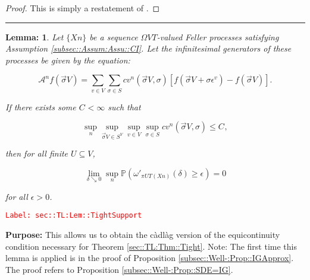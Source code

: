 \documentclass[12pt]{article}
\newcommand{\mb}{\mathbb}
\newcommand{\mc}{\mathcal}
\newcommand{\ep}{\epsilon}
\newcommand{\tr}{\textcolor{red}}
\newcommand{\labe}[1]{\tr{\texttt{Label: #1}}}
\newcommand{\purpose}{\textbf{Purpose: }}
\newcommand{\lin}{\rule{\linewidth}{0.4 pt}}
\newcommand{\pr}{\mb{P}}							%
\renewcommand{\v}{v}							%
\renewcommand{\U}{U}							%
\renewcommand{\S}{S}							%
\newcommand{\s}{\sigma}							%
\newcommand{\sv}{\vec{\s}}						%
\newcommand{\ev}[1]{\ep^{#1}}					%
\newcommand{\T}{T}								%
\newcommand{\proj}{\pi}							%
\newcommand{\X}{X}								%
\newcommand{\IG}{\mc{A}}						%
\newcommand{\IGr}{c}							%
\newcommand{\pup}[1]{^{#1}}							%
\newcommand{\numb}{n}								%
\newcommand{\XState}[1]{\S^{#1}}				%
\newcommand{\const}[1]{C_{#1}}						%
\newtheorem{lem}[thms]{Lemma: }
\begin{document}
\begin{proof}
This is simply a restatement of \cite[Theorem 13.2]{Bil99}.
\end{proof}

\lin

\begin{lem}
Let \(\{\X{}{}{\numb}\}\) be a sequence \(\Omega{ V}{\T}\)-valued Feller processes satisfying Assumption \ref{subsec::Assum:Assu::CI}. Let the infinitesimal generators of these processes be given by the equation:

\[\IG\pup{\numb}f(\sv{}{ V}) = \sum_{\v\in  V}\sum_{\s \in \S} \IGr{\v}\pup{\numb}(\sv{}{ V},\s)[f(\sv{}{ V} + \s\ev{\v}) - f(\sv{}{ V})].\]

If there exists some \(\const{} < \infty\) such that

\[\sup_{\numb}\sup_{\sv{}{ V}\in \S^ V}\sup_{\v\in V}\sup_{\s\in \S} \IGr{\v}\pup{\numb}(\sv{}{ V},\s) \leq \const{},\]

then for all finite \(\U \subseteq  V\),

\[\lim_{\delta \searrow 0} \sup_\numb \pr\left(\omega'_{\proj{\U}{\T}\left(\X{}{}{\numb}\right)}(\delta) \geq \ep\right) = 0\]

for all \(\ep > 0\).
\label{sec::TL:Lem::TightSupport}
\end{lem}
\labe{sec::TL:Lem::TightSupport}

\purpose This allows us to obtain the c\`adl\`ag version of the equicontinuity condition necessary for Theorem \ref{sec::TL:Thm::Tight}. Note: The first time this lemma is applied is in the proof of Proposition \ref{subsec::Well-:Prop::IGApprox}. The proof refers to Proposition \ref{subsec::Well-:Prop::SDE=IG}.
\end{document}
